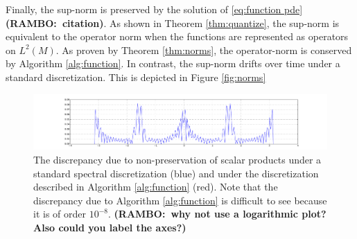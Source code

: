\documentclass[final,leqno]{siamltex1213}
\newcommand{\ram}[1]{{\normalsize{\textbf{({\color{red}RAMBO:\ }#1)}}}}
\begin{document}
Finally, the sup-norm is preserved by the solution of \eqref{eq:function pde} \ram{citation}.
As shown in Theorem \ref{thm:quantize}, the sup-norm is equivalent to the operator norm when the functions are represented as operators on $L^{2}(M)$.
As proven by Theorem \ref{thm:norms}, the operator-norm is conserved by Algorithm \ref{alg:function}.
In contrast, the sup-norm drifts over time under a standard discretization.  
This is depicted in Figure \ref{fig:norms}

\begin{figure}[h]
	\hspace*{-1.2cm}
	\includegraphics[width=1.15\textwidth]{./images/function_plots/discrepancy}
	\caption{The discrepancy due to non-preservation of scalar products under a standard spectral discretization (blue) and under the discretization described in Algorithm \ref{alg:function} (red). 
	Note that the discrepancy due to Algorithm \ref{alg:function} is difficult to see because it is of order $10^{-8}$. \ram{why not use a logarithmic plot? Also could you label the axes?} }
	\label{fig:discrepancy}
\end{figure}  
\end{document}
